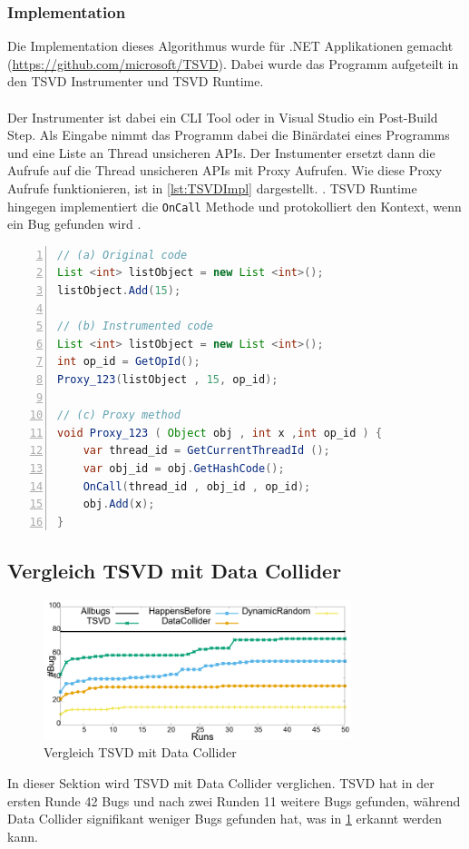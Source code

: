 \subsubsection*{Implementation}

Die Implementation dieses Algorithmus wurde für .NET Applikationen gemacht (\url{https://github.com/microsoft/TSVD}). Dabei wurde das Programm aufgeteilt in den \acs{TSVD} Instrumenter und \acs{TSVD} Runtime. \\ 
\\
Der Instrumenter ist dabei ein \ac{CLI} Tool oder in Visual Studio ein Post-Build Step. Als Eingabe nimmt das Programm dabei die Binärdatei eines Programms und eine Liste an Thread unsicheren \ac{API}s. Der Instumenter ersetzt dann die Aufrufe auf die Thread unsicheren \acs{API}s mit Proxy Aufrufen. Wie diese Proxy Aufrufe funktionieren, ist in \ref{lst:TSVDImpl} dargestellt. \cite[vgl.][170]{li_efficient_2019}. \acs{TSVD} Runtime hingegen implementiert die \texttt{OnCall} Methode und protokolliert den Kontext, wenn ein Bug gefunden wird \cite[vgl.][170-171]{li_efficient_2019}.
\\
\begin{lstlisting}[language=Java,frame=tb,caption={\acs{TSVD} Proxy Aufrufe}, label={lst:TSVDImpl}, numbers=left, stepnumber=1, captionpos=b]
// (a) Original code
List <int> listObject = new List <int>();
listObject.Add(15); 
      
// (b) Instrumented code 
List <int> listObject = new List <int>(); 
int op_id = GetOpId(); 
Proxy_123(listObject , 15, op_id); 
     
// (c) Proxy method
void Proxy_123 ( Object obj , int x ,int op_id ) { 
    var thread_id = GetCurrentThreadId (); 
    var obj_id = obj.GetHashCode(); 
    OnCall(thread_id , obj_id , op_id); 
    obj.Add(x);
}
\end{lstlisting}

\subsection*{Vergleich TSVD mit Data Collider}

\begin{figure}[ht]
    \centering
    \includegraphics[width=0.8\textwidth]{gfx/TSVDvDataCollider.png}
    \caption{Vergleich TSVD mit Data Collider \cite[173]{li_efficient_2019}}
    \label{fig:TSVDvDataCollider}
\end{figure}

In dieser Sektion wird \acs{TSVD} mit Data Collider verglichen. \acs{TSVD} hat in der ersten Runde 42 Bugs und nach zwei Runden 11 weitere Bugs gefunden, während Data Collider signifikant weniger Bugs gefunden hat, was in \ref{fig:TSVDvDataCollider} erkannt werden kann.